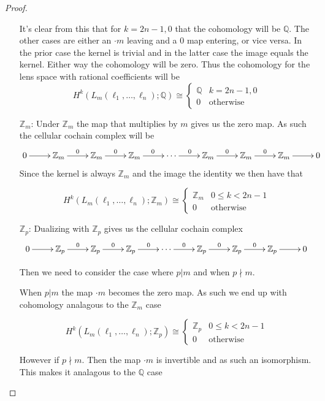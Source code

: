 \documentclass[10pt]{article}
\newcommand{\bb}[1]{\mathbb{#1}}
\theoremstyle{remark}
\begin{document}
\begin{proof}
\begin{itemize}
    It's clear from this that for $k=2n-1,0$ that the cohomology will be $\bb{Q}$. The
    other cases are either an $\cdot m$ leaving and a $0$ map entering, or vice versa.
    In the prior case the kernel is trivial and in the latter case the image equals the
    kernel. Either way the cohomology will be zero. Thus the cohomology for the lens
    space with rational coefficients will be
    \[
      H^k(L_m(\ell_1,\ldots,\ell_n);\bb{Q}) \cong  
      \left\{
        \begin{array}{ll}
          \bb{Q} & k=2n-1,0\\
          0 & \text{otherwise}
        \end{array}
      \right.
    \]
  \item[$\bb{Z}_m$:] Under $\bb{Z}_m$ the map that multiplies by $m$ gives us
    the zero map. As such the cellular cochain complex will be
    \[
      \xymatrix{
        0 \ar[r] & \bb{Z}_m \ar[r]^0 & \bb{Z}_m \ar[r]^0 & \bb{Z}_m \ar[r]^0 & \cdots \ar[r]^0 & \bb{Z}_m \ar[r]^0 & \bb{Z}_m \ar[r]^0 & \bb{Z}_m \ar[r] & 0
      }
    \]
    Since the kernel is always $\bb{Z}_m$ and the image the identity we then have that

    \[
      H^k(L_m(\ell_1,\ldots,\ell_n);\bb{Z}_m) \cong  
      \left\{
        \begin{array}{ll}
          \bb{Z}_m & 0\leq k < 2n-1\\
          0 & \text{otherwise}
        \end{array}
      \right.
    \]
  \item[$\bb{Z}_p$:]
    Dualizing with $\bb{Z}_p$ gives us the cellular cochain complex
    \[
      \xymatrix{
        0 \ar[r] & \bb{Z}_p \ar[r]^0 & \bb{Z}_p \ar[r]^0 & \bb{Z}_p \ar[r]^0 & \cdots \ar[r]^0 & \bb{Z}_p \ar[r]^0 & \bb{Z}_p \ar[r]^0 & \bb{Z}_p \ar[r] & 0
      }
    \]

    Then we need to consider the case where $p|m$ and when $p\nmid m$.

    When $p|m$ the map $\cdot m$ becomes the zero map. As such we end up
    with cohomology analagous to the $\bb{Z}_m$ case

    \[
      H^k(L_m(\ell_1,\ldots,\ell_n);\bb{Z}_p) \cong  
      \left\{
        \begin{array}{ll}
          \bb{Z}_p & 0\leq k<2n-1\\
          0 & \text{otherwise}
        \end{array}
      \right.
    \]

    However if $p\nmid m$. Then the map $\cdot m$ is invertible and as such an
    isomorphism. This makes it analagous to the $\bb{Q}$ case


\end{itemize}
\end{proof}
\end{document}
